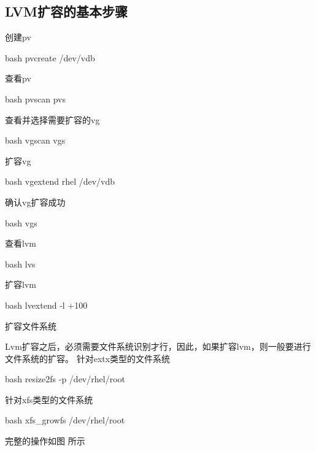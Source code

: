 \subsection{LVM扩容的基本步骤}
\begin{outline}[enumerate]
  \1 创建pv
\begin{code-block}{bash}
pvcreate /dev/vdb
\end{code-block}

  \1 查看pv
\begin{code-block}{bash}
pvscan
pvs
\end{code-block}

  \1 查看并选择需要扩容的vg
\begin{code-block}{bash}
vgscan
vgs
\end{code-block}

  \1 扩容vg
\begin{code-block}{bash}
vgextend rhel /dev/vdb
\end{code-block}

  \1 确认vg扩容成功
\begin{code-block}{bash}
vgs
\end{code-block}

  \1 查看lvm
\begin{code-block}{bash}
lvs
\end{code-block}

  \1 扩容lvm
\begin{code-block}{bash}
lvextend -l +100%
\end{code-block}

  \1 扩容文件系统

      Lvm扩容之后，必须需要文件系统识别才行，因此，如果扩容lvm，则一般要进行文件系统的扩容。
      针对extx类型的文件系统
\begin{code-block}{bash}
resize2fs -p /dev/rhel/root
\end{code-block}

      针对xfs类型的文件系统
\begin{code-block}{bash}
xfs_growfs /dev/rhel/root
\end{code-block}

\end{outline}
完整的操作如图 所示
